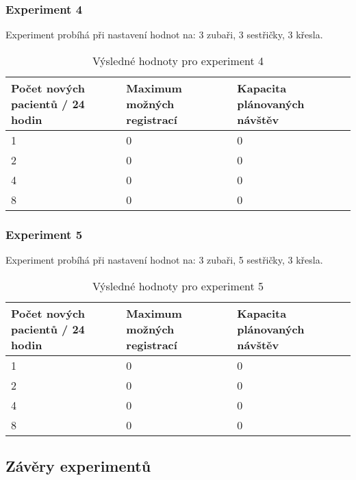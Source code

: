 \documentclass[a4paper,11pt,titlepage]{article}
\begin{document}
\subsubsection{Experiment 4}

Experiment probíhá při nastavení hodnot na: 3 zubaři, 3 sestřičky, 3 křesla.

\begin{table}[h]
\centering
\begin{tabular}{|l|l|l|}
\hline
Počet nových pacientů / 24 hodin & Maximum možných registrací & Kapacita plánovaných návštěv \\ \hline
1        & 0                	& 0           		\\ \hline
2       & 0          		& 0           		\\ \hline
4       & 0   			& 0        		\\ \hline
8       & 0   			& 0           		\\ \hline
\end{tabular}
\caption {Výsledné hodnoty pro experiment 4} \label{tab:title} 
\end{table}

\subsubsection{Experiment 5}

Experiment probíhá při nastavení hodnot na: 3 zubaři, 5 sestřičky, 3 křesla.

\begin{table}[h!]
\centering
\begin{tabular}{|l|l|l|}
\hline
Počet nových pacientů / 24 hodin & Maximum možných registrací & Kapacita plánovaných návštěv \\ \hline
1        & 0                	& 0           		\\ \hline
2       & 0          		& 0           		\\ \hline
4       & 0   			& 0        		\\ \hline
8       & 0   			& 0           		\\ \hline
\end{tabular}
\caption {Výsledné hodnoty pro experiment 5} \label{tab:title} 
\end{table}

\subsection{Závěry experimentů}
\end{document}
